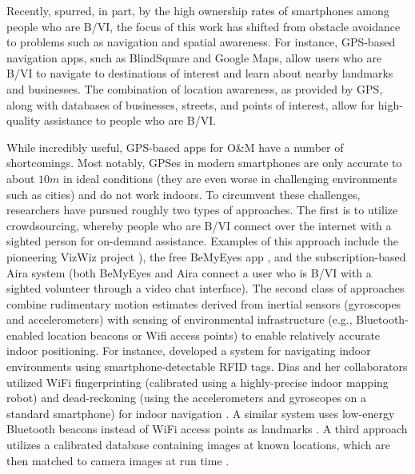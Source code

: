 \documentclass[chi_draft]{sigchi}
\newcommand{\BVI}{B/VI\xspace}
\newcommand{\OM}{O\&M\xspace}
\begin{document}
Recently, spurred, in part, by the high ownership rates of smartphones among people who are \BVI, the focus of this work has shifted from obstacle avoidance to problems such as navigation and spatial awareness.  For instance, GPS-based navigation apps, such as BlindSquare \cite{blindsquare} and Google Maps, allow users who are \BVI to navigate to destinations of interest and learn about nearby landmarks and businesses.  The combination of location awareness, as provided by GPS, along with databases of businesses, streets, and points of interest, allow for high-quality assistance to people who are \BVI.

While incredibly useful, GPS-based apps for \OM have a number of shortcomings.  Most notably, GPSes in modern smartphones are only accurate to about $10m$ in ideal conditions (they are even worse in challenging environments such as cities) and do not work indoors.  To circumvent these challenges, researchers have pursued roughly two types of approaches.  The first is to utilize crowdsourcing, whereby people who are \BVI connect over the internet with a sighted person for on-demand assistance.  Examples of this approach include the pioneering VizWiz project \cite{bigham2010vizwiz}), the free BeMyEyes app \cite{bemyeyesaccessworld}, and the subscription-based Aira system \cite{aira} (both BeMyEyes and Aira connect a user who is \BVI with a sighted volunteer through a video chat interface).  The second class of approaches combine rudimentary motion estimates derived from inertial sensors (gyroscopes and accelerometers) with sensing of environmental infrastructure (e.g., Bluetooth-enabled location beacons or Wifi access points) to enable relatively accurate indoor positioning.  For instance, \cite{ganz2015percept, ganz2011percept, ganz2014percept} developed a system for navigating indoor environments using smartphone-detectable RFID tags.  Dias and her collaborators utilized WiFi fingerprinting (calibrated using a highly-precise indoor mapping robot) and dead-reckoning (using the accelerometers and gyroscopes on a standard smartphone) for indoor navigation \cite{Dias__2014_7778}.  A similar system uses low-energy Bluetooth beacons instead of WiFi access points as landmarks \cite{ishihara2017beacon, ahmetovic2016navcog, ahmetovic2017achieving}.  A third approach utilizes a calibrated database containing images at known locations, which are then matched to camera images at run time \cite{bai2014wearable}.
\end{document}
